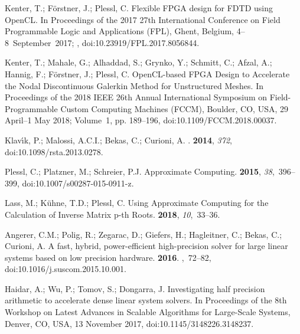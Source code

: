 \documentclass[computation,article,accept,moreauthors,pdftex]{Definitions/mdpi}
\begin{document}
\begin{thebibliography}{999}
Kenter, T.; F\"orstner, J.; Plessl, C.
\newblock Flexible FPGA design for FDTD using OpenCL.
\newblock In Proceedings of the 2017 27th International Conference on Field Programmable Logic and Applications (FPL), Ghent, Belgium, 4--8~September~2017; , doi:10.23919/FPL.2017.8056844.

Kenter, T.; Mahale, G.; Alhaddad, S.; Grynko, Y.; Schmitt, C.; Afzal, A.;
 Hannig, F.; F\"orstner, J.; Plessl, C.
\newblock OpenCL-based FPGA Design to Accelerate the Nodal Discontinuous
 Galerkin Method for Unstructured Meshes.
\newblock In Proceedings of the 2018 IEEE 26th Annual International Symposium on Field-Programmable Custom Computing Machines (FCCM), Boulder, CO, USA, 29 April--1 May 2018; Volume~1, pp. 189--196, doi:10.1109/FCCM.2018.00037.

Klav{\'\i}k, P.; Malossi, A.C.I.; Bekas, C.; Curioni, A.
.
 {\bf 2014}, {\em 372}, doi:10.1098/rsta.2013.0278.

Plessl, C.; Platzner, M.; Schreier, P.J.
\newblock Approximate Computing.
 {\bf 2015}, {\em 38},~396--399, doi:10.1007/s00287-015-0911-z.

Lass, M.; K\"uhne, T.D.; Plessl, C.
\newblock Using Approximate Computing for the Calculation of Inverse Matrix
 p-th Roots.
 {\bf 2018}, {\em 10},~33--36.

Angerer, C.M.; Polig, R.; Zegarac, D.; Giefers, H.; Hagleitner, C.; Bekas, C.;
 Curioni, A.
\newblock A fast, hybrid, power-efficient high-precision solver for large
 linear systems based on low precision hardware. {\bf 2016}.
,~72--82, doi:10.1016/j.suscom.2015.10.001.

Haidar, A.; Wu, P.; Tomov, S.; Dongarra, J.
\newblock Investigating half precision arithmetic to accelerate dense linear
 system solvers.
\newblock In Proceedings of the 8th Workshop on Latest Advances in Scalable Algorithms for
 Large-Scale Systems, Denver, CO, USA, 13 November 2017, doi:10.1145/3148226.3148237.


\end{thebibliography}
\end{document}
